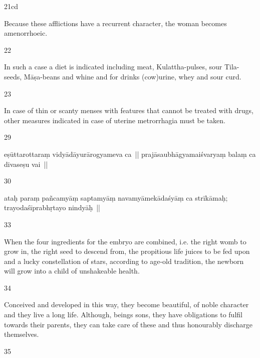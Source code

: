 \begin{translation}
\begin{tt}
\item[21cd]

Because these afflictions have a recurrent character, the woman 
  becomes amenorrhoeic. 
  
\item[22]

In such a case a diet is indicated including meat, Kulattha-pulses, sour 
  Tila-seeds, Māṣa-beans and whine and for drinks (cow)urine, whey and sour 
  curd.
  
\item[23]

In case of thin or scanty menses with features that cannot be treated 
  with drugs, other measures indicated in case of uterine metrorrhagia must be 
  taken. 
  
\item[29]


  eṣūttarottaraṃ vidyādāyurārogyameva ca || prajāsaubhāgyamaiśvaryaṃ balaṃ 
  ca divaseṣu vai ||
  
\item[30]


  ataḥ paraṃ pañcamyāṃ saptamyāṃ navamyāmekādaśyāṃ ca strīkāmaḥ; 
  trayodaśīprabhṛtayo nindyāḥ ||
  
\item[33]

 When the four ingredients for the embryo are combined, i.e. the right 
  womb to grow in, the right seed to descend from, the propitious life juices to be 
  fed upon and a lucky constellation of stars, according to age-old tradition, the 
  newborn will grow into a child of unshakeable health. 
  
\item[34]

Conceived and developed in this way, they become beautiful, of noble 
  character and they live a long life. Although, beings sons, they have obligations 
  to fulfil towards their parents, they can take care of these and thus honourably 
  discharge themselves.
  
\item[35]


\end{tt}
\end{translation}
